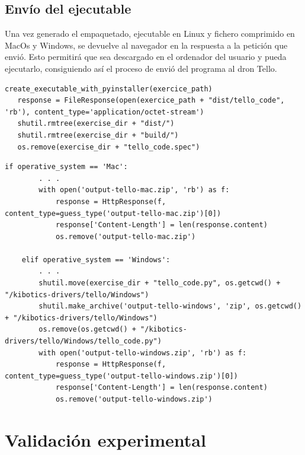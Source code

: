 \documentclass{report}
\begin{document}
\subsection{Envío del ejecutable}

Una vez generado el empaquetado, ejecutable en Linux y fichero comprimido en MacOs y Windows, se devuelve al navegador en la respuesta a la petición que envió. Esto permitirá que sea descargado en el ordenador del usuario y pueda ejecutarlo, consiguiendo así el proceso de envió del programa al dron Tello.
	\\
\begin{lstlisting}[frame=single,breaklines=true, label=Respuesta a la petición para Linux, caption=Respuesta a la petición para Linux,  captionpos=b]
   create_executable_with_pyinstaller(exercice_path)
   response = FileResponse(open(exercice_path + "dist/tello_code", 'rb'), content_type='application/octet-stream')
   shutil.rmtree(exercise_dir + "dist/")
   shutil.rmtree(exercise_dir + "build/")
   os.remove(exercise_dir + "tello_code.spec")
\end{lstlisting}
\begin{lstlisting}[frame=single,breaklines=true, label=Respuesta con empaquetado en Windows y MacOs, caption=Creación empaquetado y respuesta en Windows y MacOs,  captionpos=b]
   if operative_system == 'Mac':
        . . . 
        with open('output-tello-mac.zip', 'rb') as f:
            response = HttpResponse(f, content_type=guess_type('output-tello-mac.zip')[0])
            response['Content-Length'] = len(response.content)
            os.remove('output-tello-mac.zip')

    elif operative_system == 'Windows':
        . . .
        shutil.move(exercise_dir + "tello_code.py", os.getcwd() + "/kibotics-drivers/tello/Windows")
        shutil.make_archive('output-tello-windows', 'zip', os.getcwd() + "/kibotics-drivers/tello/Windows")
        os.remove(os.getcwd() + "/kibotics-drivers/tello/Windows/tello_code.py")
        with open('output-tello-windows.zip', 'rb') as f:
            response = HttpResponse(f, content_type=guess_type('output-tello-windows.zip')[0])
            response['Content-Length'] = len(response.content)
            os.remove('output-tello-windows.zip')
\end{lstlisting}	

\section{Validación experimental}
\end{document}
